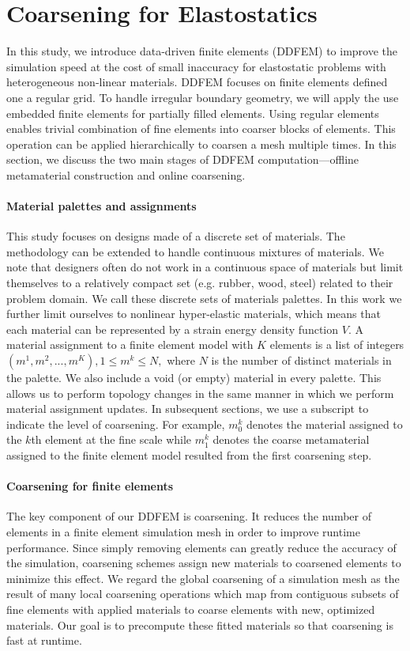 \section{Coarsening for Elastostatics}
In this study, we introduce data-driven finite elements (DDFEM) to 
improve the simulation speed at the cost of small inaccuracy for elastostatic problems with heterogeneous non-linear materials. DDFEM focuses on finite elements defined one a regular grid.
To handle irregular boundary geometry, we will apply the use embedded finite elements for partially filled elements.
Using regular elements enables trivial combination of fine elements into coarser blocks of elements. This operation can be applied hierarchically to coarsen a mesh multiple times.
In this section, we discuss the two main stages of DDFEM computation---offline metamaterial construction and online coarsening.

\paragraph{Material palettes and assignments}
This study focuses on designs made of a discrete set of materials. The methodology can be extended to handle continuous mixtures of materials.
We note that designers often do not work in a continuous space of materials but limit themselves to a relatively compact set (e.g. rubber, wood, steel) related to their problem domain. We call these discrete sets of materials palettes. In this work we further limit ourselves to nonlinear hyper-elastic materials, which means that each material can be represented by a strain energy density function $V$.
A material assignment to a finite element model with $K$ elements is a list of integers $(m^1,m^2,...,m^K), 1\leq m^k\leq N,$ where $N$ is the number of distinct materials in the palette.
We also include a void (or empty) material in every palette. This allows us to perform topology changes in the same manner in which we perform material assignment updates.
In subsequent sections, we use a subscript to indicate the level of coarsening. For example, $m_0^k$ denotes the material assigned to the $k$th element at the fine scale while $m_1^k$ denotes the coarse metamaterial assigned to the finite element model resulted from the first coarsening step.

\paragraph{Coarsening for finite elements}
The key component of our DDFEM is coarsening. It reduces the number of elements in a finite element simulation mesh in order to improve runtime performance. Since simply removing elements can greatly reduce the accuracy of the simulation, coarsening schemes assign new materials to coarsened elements to minimize this effect.
We regard the global coarsening of a simulation mesh as the result of many local coarsening operations which map from contiguous subsets of fine elements with applied materials to coarse elements with new, optimized materials.
Our goal is to precompute these fitted materials so that coarsening is fast at runtime.

